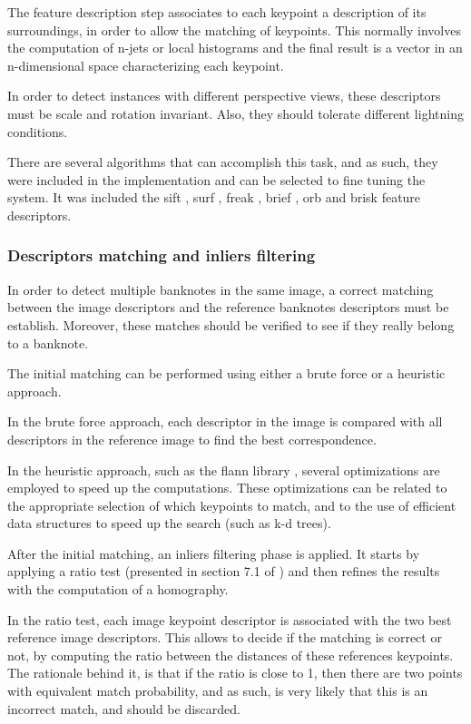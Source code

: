 The feature description step associates to each keypoint a description of its surroundings, in order to allow the matching of keypoints. This normally involves the computation of n-jets or local histograms and the final result is a vector in an n-dimensional space characterizing each keypoint.

In order to detect instances with different perspective views, these descriptors must be scale and rotation invariant. Also, they should tolerate different lightning conditions.

There are several algorithms that can accomplish this task, and as such, they were included in the implementation and can be selected to fine tuning the system. It was included the \gls{sift} \cite{Lowe2004}, \gls{surf} \cite{Bay2006}, \gls{freak} \cite{Alahi2012}, \gls{brief} \cite{Calonder2010}, \gls{orb} \cite{Rublee2011} and \gls{brisk} \cite{Leutenegger2011} feature descriptors.


\subsubsection{Descriptors matching and inliers filtering}\label{sec:descriptors-matching-and-inliers-filtering}

In order to detect multiple banknotes in the same image, a correct matching between the image descriptors and the reference banknotes descriptors must be establish. Moreover, these matches should be verified to see if they really belong to a banknote.

The initial matching can be performed using either a brute force or a heuristic approach.

In the brute force approach, each descriptor in the image is compared with all descriptors in the reference image to find the best correspondence.

In the heuristic approach, such as the \gls{flann} library \cite{Muja2009}, several optimizations are employed to speed up the computations. These optimizations can be related to the appropriate selection of which keypoints to match, and to the use of efficient data structures to speed up the search (such as k-d trees).

After the initial matching, an inliers filtering phase is applied. It starts by applying a ratio test (presented in section 7.1 of \cite{Lowe2004}) and then refines the results with the computation of a homography.

In the ratio test, each image keypoint descriptor is associated with the two best reference image descriptors. This allows to decide if the matching is correct or not, by computing the ratio between the distances of these references keypoints. The rationale behind it, is that if the ratio is close to 1, then there are two points with equivalent match probability, and as such, is very likely that this is an incorrect match, and should be discarded.

